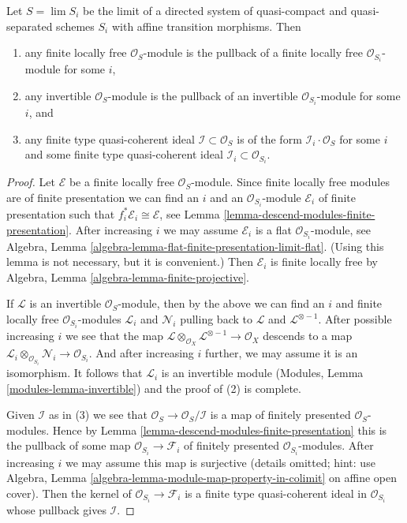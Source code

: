 \begin{lemma}
\label{lemma-descend-invertible-modules}
Let $S = \lim S_i$ be the limit of a directed system of quasi-compact and
quasi-separated schemes $S_i$ with affine transition morphisms. Then
\begin{enumerate}
\item any finite locally free $\mathcal{O}_S$-module is the pullback
of a finite locally free $\mathcal{O}_{S_i}$-module for some $i$,
\item any invertible $\mathcal{O}_S$-module is the pullback of an invertible
$\mathcal{O}_{S_i}$-module for some $i$, and
\item any finite type quasi-coherent ideal $\mathcal{I} \subset \mathcal{O}_S$
is of the form $\mathcal{I}_i \cdot \mathcal{O}_S$ for some $i$ and some
finite type quasi-coherent ideal $\mathcal{I}_i \subset \mathcal{O}_{S_i}$.
\end{enumerate}
\end{lemma}

\begin{proof}
Let $\mathcal{E}$ be a finite locally free $\mathcal{O}_S$-module. Since
finite locally free modules are of finite presentation we can find an $i$
and an $\mathcal{O}_{S_i}$-module $\mathcal{E}_i$ of finite presentation
such that $f_i^*\mathcal{E}_i \cong \mathcal{E}$, see
Lemma \ref{lemma-descend-modules-finite-presentation}.
After increasing $i$ we may assume $\mathcal{E}_i$ is a flat
$\mathcal{O}_{S_i}$-module, see
Algebra, Lemma \ref{algebra-lemma-flat-finite-presentation-limit-flat}.
(Using this lemma is not necessary, but it is convenient.)
Then $\mathcal{E}_i$ is finite locally free by
Algebra, Lemma \ref{algebra-lemma-finite-projective}.

\medskip\noindent
If $\mathcal{L}$ is an invertible $\mathcal{O}_S$-module,
then by the above we can find an $i$ and finite locally
free $\mathcal{O}_{S_i}$-modules $\mathcal{L}_i$
and $\mathcal{N}_i$ pulling back to $\mathcal{L}$ and
$\mathcal{L}^{\otimes -1}$. After possible increasing
$i$ we see that the map
$\mathcal{L} \otimes_{\mathcal{O}_X} \mathcal{L}^{\otimes -1}
\to \mathcal{O}_X$ descends to a map
$\mathcal{L}_i \otimes_{\mathcal{O}_{S_i}} \mathcal{N}_i \to
\mathcal{O}_{S_i}$. And after increasing $i$ further, we
may assume it is an isomorphism. It follows that
$\mathcal{L}_i$ is an invertible module
(Modules, Lemma \ref{modules-lemma-invertible}) and
the proof of (2) is complete.

\medskip\noindent
Given $\mathcal{I}$ as in (3) we see that
$\mathcal{O}_S \to \mathcal{O}_S/\mathcal{I}$
is a map of finitely presented $\mathcal{O}_S$-modules.
Hence by Lemma \ref{lemma-descend-modules-finite-presentation}
this is the pullback of some
map $\mathcal{O}_{S_i} \to \mathcal{F}_i$ of finitely
presented $\mathcal{O}_{S_i}$-modules. After increasing $i$
we may assume this map is surjective (details omitted; hint: use
Algebra, Lemma \ref{algebra-lemma-module-map-property-in-colimit}
on affine open cover). Then the kernel of $\mathcal{O}_{S_i} \to \mathcal{F}_i$
is a finite type quasi-coherent ideal in $\mathcal{O}_{S_i}$
whose pullback gives $\mathcal{I}$.
\end{proof}

